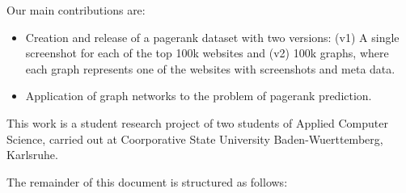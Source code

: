 Our main contributions are:
\begin{itemize}
\item Creation and release of a pagerank dataset with two versions: (v1) A single screenshot for each of the top 100k websites and (v2) 100k graphs, where each graph represents one of the websites with screenshots and meta data.
\item Application of graph networks to the problem of pagerank prediction.
\end{itemize}

This work is a student research project of two students of Applied Computer Science, carried out at Coorporative State University Baden-Wuerttemberg, Karlsruhe.

The remainder of this document is structured as follows: 
